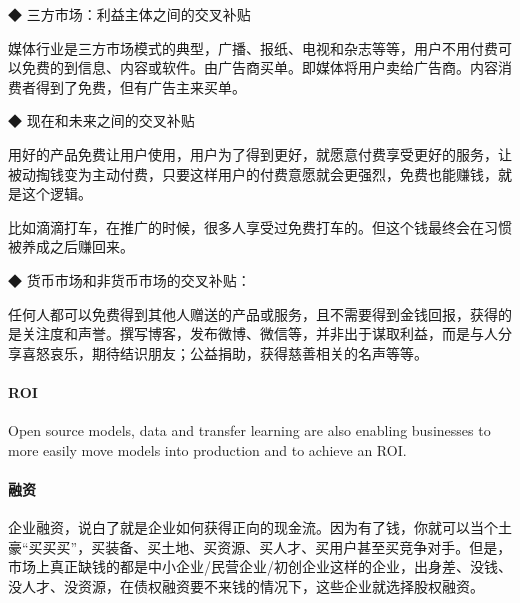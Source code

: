 \documentclass[letterpaper,11pt,english]{sphinxmanual}
\begin{document}
◆ 三方市场：利益主体之间的交叉补贴

媒体行业是三方市场模式的典型，广播、报纸、电视和杂志等等，用户不用付费可以免费的到信息、内容或软件。由广告商买单。即媒体将用户卖给广告商。内容消费者得到了免费，但有广告主来买单。

◆ 现在和未来之间的交叉补贴

用好的产品免费让用户使用，用户为了得到更好，就愿意付费享受更好的服务，让被动掏钱变为主动付费，只要这样用户的付费意愿就会更强烈，免费也能赚钱，就是这个逻辑。%
\begin{footnote}[118]\sphinxAtStartFootnote
{}
%
\end{footnote}

比如滴滴打车，在推广的时候，很多人享受过免费打车的。但这个钱最终会在习惯被养成之后赚回来。

◆ 货币市场和非货币市场的交叉补贴：

任何人都可以免费得到其他人赠送的产品或服务，且不需要得到金钱回报，获得的是关注度和声誉。撰写博客，发布微博、微信等，并非出于谋取利益，而是与人分享喜怒哀乐，期待结识朋友；公益捐助，获得慈善相关的名声等等。


\paragraph{ROI}
\label{\detokenize{chapter_introduction/money:roi}}
Open source models, data and transfer learning are also enabling
businesses to more easily move models into production and to achieve an
ROI.


\paragraph{融资}
\label{\detokenize{chapter_introduction/money:id26}}
企业融资，说白了就是企业如何获得正向的现金流。因为有了钱，你就可以当个土豪“买买买”，买装备、买土地、买资源、买人才、买用户甚至买竞争对手。但是，市场上真正缺钱的都是中小企业/民营企业/初创企业这样的企业，出身差、没钱、没人才、没资源，在债权融资要不来钱的情况下，这些企业就选择股权融资。
\end{document}
